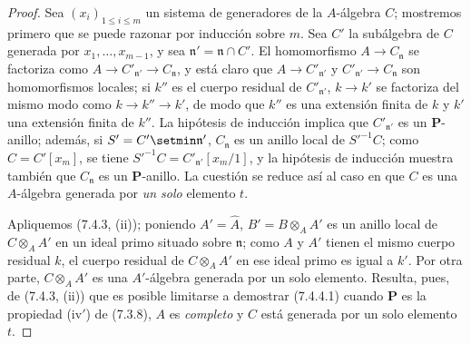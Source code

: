 \begin{proof}
Sea $(x_i)_{1\leqslant i\leqslant m}$ un sistema de generadores de la
$A$-álgebra $C$; mostremos primero que se puede razonar por inducción sobre
$m$. Sea $C'$ la subálgebra de $C$ generada por
$x_1,\ldots,x_{m-1}$, y sea $\mathfrak n'=\mathfrak n\cap C'$.
El homomorfismo $A\to C_{\mathfrak n}$ se factoriza como
$A\to C'_{\mathfrak n'}\to C_{\mathfrak n}$, y está claro que
$A\to C'_{\mathfrak n'}$ y $C'_{\mathfrak n'}\to C_{\mathfrak n}$ son
homomorfismos locales; si $k''$ es el cuerpo residual de
$C'_{\mathfrak n'}$, $k\to k'$ se factoriza del mismo modo como
$k\to k''\to k'$, de modo que $k''$ es una extensión finita de $k$ y $k'$
una extensión finita de $k''$. La hipótesis de inducción implica que
$C'_{\mathfrak n'}$ es un $\boldsymbol P$-anillo; además, si
$S'=C'\setmin\mathfrak n'$, $C_{\mathfrak n}$ es un anillo local de
$S'^{-1}C$; como $C=C'[x_m]$, se tiene
$S'^{-1}C=C'_{\mathfrak n'}[x_m/1]$, y la hipótesis de inducción muestra
también que $C_{\mathfrak n}$ es un $\boldsymbol P$-anillo. La cuestión se reduce así al caso en que $C$ es una $A$-álgebra generada por \emph{un solo} elemento $t$.

Apliquemos (7.4.3, (ii)); poniendo $A'=\widehat A$,
$B'=B\otimes_A A'$ es un anillo local de $C\otimes_A A'$ en un ideal
primo situado sobre $\mathfrak n$; como $A$ y $A'$ tienen el mismo cuerpo
residual $k$, el cuerpo residual de $C\otimes_A A'$ en ese ideal primo es
igual a $k'$. Por otra parte, $C\otimes_A A'$ es una $A'$-álgebra generada
por un solo elemento. Resulta, pues, de (7.4.3, (ii)) que es posible
limitarse a demostrar (7.4.4.1) cuando $\boldsymbol P$ es la propiedad
(iv$'$) de (7.3.8), $A$ es \emph{completo} y $C$ está generada por un solo
elemento $t$.


\end{proof}
